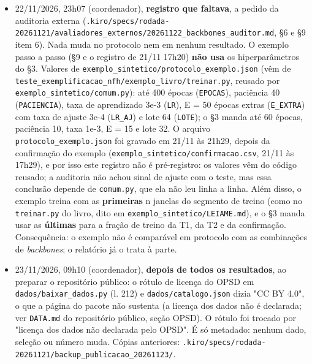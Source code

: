 \documentclass[11pt,a4paper]{article}
\begin{document}
\begin{itemize}
\item 22/11/2026, 23h07 (coordenador), \textbf{registro que faltava}, a pedido da auditoria externa (\texttt{.\allowbreak{}kiro/\allowbreak{}specs/\allowbreak{}rodada-\allowbreak{}20261121/\allowbreak{}avaliadores\_\allowbreak{}externos/\allowbreak{}20261122\_\allowbreak{}backbones\_\allowbreak{}auditor.\allowbreak{}md}, \S{}6 e \S{}9 item 6). Nada muda no protocolo nem em nenhum resultado. O exemplo passo a passo (\S{}9 e o registro de 21/11 17h20) \textbf{não usa} os hiperparâmetros do \S{}3. Valores de \texttt{exemplo\_\allowbreak{}sintetico/\allowbreak{}protocolo\_\allowbreak{}exemplo.\allowbreak{}json} (vêm de \texttt{teste\_\allowbreak{}exemplificacao\_\allowbreak{}nfh/\allowbreak{}exemplo\_\allowbreak{}livro/\allowbreak{}treinar.\allowbreak{}py}, reusado por \texttt{exemplo\_\allowbreak{}sintetico/\allowbreak{}comum.\allowbreak{}py}): até 400 épocas (\texttt{EPOCAS}), paciência 40 (\texttt{PACIENCIA}), taxa de aprendizado 3e-3 (\texttt{LR}), E = 50 épocas extras (\texttt{E\_\allowbreak{}EXTRA}) com taxa de ajuste 3e-4 (\texttt{LR\_\allowbreak{}AJ}) e lote 64 (\texttt{LOTE}); o \S{}3 manda até 60 épocas, paciência 10, taxa 1e-3, E = 15 e lote 32. O arquivo \texttt{protocolo\_\allowbreak{}exemplo.\allowbreak{}json} foi gravado em 21/11 às 21h29, depois da confirmação do exemplo (\texttt{exemplo\_\allowbreak{}sintetico/\allowbreak{}confirmacao.\allowbreak{}csv}, 21/11 às 17h29), e por isso este registro não é pré-registro: os valores vêm do código reusado; a auditoria não achou sinal de ajuste com o teste, mas essa conclusão depende de \texttt{comum.\allowbreak{}py}, que ela não leu linha a linha. Além disso, o exemplo treina com as \textbf{primeiras} n janelas do segmento de treino (como no \texttt{treinar.\allowbreak{}py} do livro, dito em \texttt{exemplo\_\allowbreak{}sintetico/\allowbreak{}LEIAME.\allowbreak{}md}), e o \S{}3 manda usar as \textbf{últimas} para a fração de treino da T1, da T2 e da confirmação. Consequência: o exemplo não é comparável em protocolo com as combinações de \emph{backbones}; o relatório já o trata à parte.
\item 23/11/2026, 09h10 (coordenador), \textbf{depois de todos os resultados}, ao preparar o repositório público: o rótulo de licença do OPSD em \texttt{dados/\allowbreak{}baixar\_\allowbreak{}dados.\allowbreak{}py} (l. 212) e \texttt{dados/\allowbreak{}catalogo.\allowbreak{}json} dizia "CC BY 4.0", o que a página do pacote não sustenta (a licença dos dados não é declarada; ver \texttt{DATA.\allowbreak{}md} do repositório público, seção OPSD). O rótulo foi trocado por "licença dos dados não declarada pelo OPSD". É só metadado: nenhum dado, seleção ou número muda. Cópias anteriores: \texttt{.\allowbreak{}kiro/\allowbreak{}specs/\allowbreak{}rodada-\allowbreak{}20261121/\allowbreak{}backup\_\allowbreak{}publicacao\_\allowbreak{}20261123/\allowbreak{}}.
\end{itemize}
\end{document}
